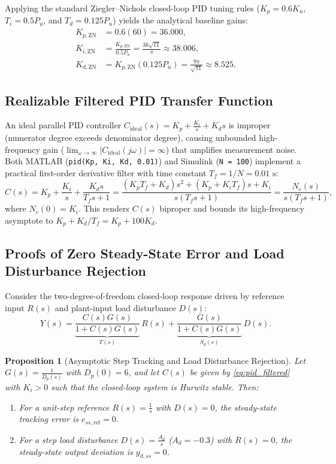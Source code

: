 \documentclass[11pt,a4paper]{article}
\newtheorem{proposition}{Proposition}
\begin{document}
Applying the standard Ziegler--Nichols closed-loop PID tuning rules ($K_p = 0.6K_u$, $T_i = 0.5P_u$, and $T_d = 0.125P_u$) yields the analytical baseline gains:
\begin{align}
  K_{p,\text{ZN}} &= 0.6(60) = 36.000, \label{eq:zn_kp} \\
  K_{i,\text{ZN}} &= \frac{K_{p,\text{ZN}}}{0.5 P_u} = \frac{36\sqrt{11}}{\pi} \approx 38.006, \label{eq:zn_ki} \\
  K_{d,\text{ZN}} &= K_{p,\text{ZN}}(0.125 P_u) = \frac{9\pi}{\sqrt{11}} \approx 8.525. \label{eq:zn_kd}
\end{align}

\subsection{Realizable Filtered PID Transfer Function}
An ideal parallel PID controller $C_{\text{ideal}}(s) = K_p + \frac{K_i}{s} + K_d s$ is improper (numerator degree exceeds denominator degree), causing unbounded high-frequency gain ($\lim_{\omega \to \infty} |C_{\text{ideal}}(j\omega)| = \infty$) that amplifies measurement noise. Both MATLAB (\texttt{pid(Kp, Ki, Kd, 0.01)}) and Simulink (\texttt{N = 100}) implement a practical first-order derivative filter with time constant $T_f = 1/N = 0.01\text{ s}$:
\begin{equation}
  C(s) = K_p + \frac{K_i}{s} + \frac{K_d s}{T_f s + 1} = \frac{(K_p T_f + K_d)s^2 + (K_p + K_i T_f)s + K_i}{s(T_f s + 1)} = \frac{N_c(s)}{s(T_f s + 1)},
  \label{eq:pid_filtered}
\end{equation}
where $N_c(0) = K_i$. This renders $C(s)$ biproper and bounds its high-frequency asymptote to $K_p + K_d/T_f = K_p + 100K_d$.

\subsection{Proofs of Zero Steady-State Error and Load Disturbance Rejection}
Consider the two-degree-of-freedom closed-loop response driven by reference input $R(s)$ and plant-input load disturbance $D(s)$:
\begin{equation}
  Y(s) = \underbrace{\frac{C(s)G(s)}{1 + C(s)G(s)}}_{T(s)}\,R(s) + \underbrace{\frac{G(s)}{1 + C(s)G(s)}}_{S_d(s)}\,D(s).
  \label{eq:closed_loop_two_input}
\end{equation}

\begin{proposition}[Asymptotic Step Tracking and Load Disturbance Rejection]
Let $G(s) = \frac{1}{D_p(s)}$ with $D_p(0) = 6$, and let $C(s)$ be given by \eqref{eq:pid_filtered} with $K_i > 0$ such that the closed-loop system is Hurwitz stable. Then:
\begin{enumerate}[label=(\alph*),leftmargin=2em]
  \item For a unit-step reference $R(s) = \frac{1}{s}$ with $D(s) = 0$, the steady-state tracking error is $e_{ss,\text{ref}} = 0$.
  \item For a step load disturbance $D(s) = \frac{A_d}{s}$ ($A_d = -0.3$) with $R(s) = 0$, the steady-state output deviation is $y_{d,ss} = 0$.
\end{enumerate}
\end{proposition}
\end{document}
